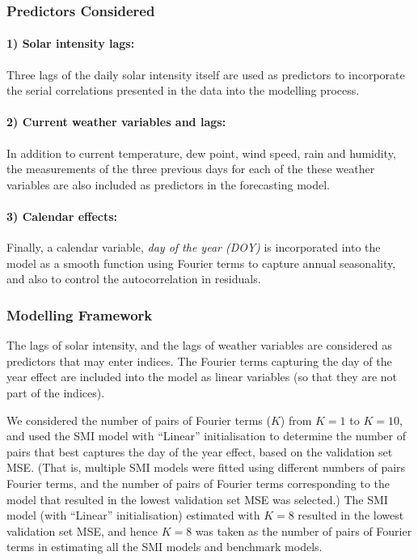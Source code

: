 \documentclass[
  11pt,
  a4paper,
]{article}
\begin{document}
\subsubsection{Predictors Considered}\label{predictors-considered-1}

\paragraph{1) Solar intensity lags:}\label{solar-intensity-lags}

Three lags of the daily solar intensity itself are used as predictors to
incorporate the serial correlations presented in the data into the
modelling process.

\paragraph{2) Current weather variables and
lags:}\label{current-weather-variables-and-lags}

In addition to current temperature, dew point, wind speed, rain and
humidity, the measurements of the three previous days for each of the
these weather variables are also included as predictors in the
forecasting model.

\paragraph{3) Calendar effects:}\label{calendar-effects-1}

Finally, a calendar variable, \emph{day of the year (DOY)} is
incorporated into the model as a smooth function using Fourier terms to
capture annual seasonality, and also to control the autocorrelation in
residuals.

\subsubsection{Modelling Framework}\label{modelling-framework-1}

The lags of solar intensity, and the lags of weather variables are
considered as predictors that may enter indices. The Fourier terms
capturing the day of the year effect are included into the model as
linear variables (so that they are not part of the indices).

We considered the number of pairs of Fourier terms (\(K\)) from
\(K = 1\) to \(K = 10\), and used the SMI model with ``Linear''
initialisation to determine the number of pairs that best captures the
day of the year effect, based on the validation set MSE. (That is,
multiple SMI models were fitted using different numbers of pairs Fourier
terms, and the number of pairs of Fourier terms corresponding to the
model that resulted in the lowest validation set MSE was selected.) The
SMI model (with ``Linear'' initialisation) estimated with \(K = 8\)
resulted in the lowest validation set MSE, and hence \(K = 8\) was taken
as the number of pairs of Fourier terms in estimating all the SMI models
and benchmark models.
\end{document}
